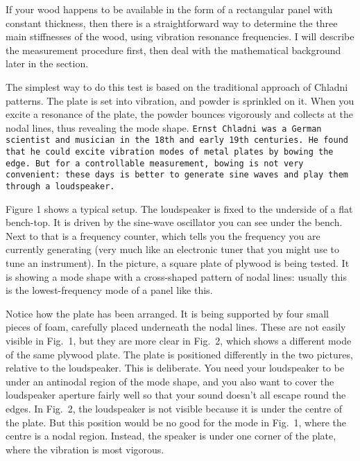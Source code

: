   If your wood happens to be available in the form of a rectangular panel with 
  constant thickness, then there is a straightforward way to determine the 
  three main stiffnesses of the wood, using vibration resonance frequencies. I 
  will describe the measurement procedure first, then deal with the 
  mathematical background later in the section. 

  The simplest way to do this test is based on the traditional approach of 
  Chladni patterns. The plate is set into vibration, and powder is sprinkled on 
  it. When you excite a resonance of the plate, the powder bounces vigorously 
  and collects at the nodal lines, thus revealing the mode shape. \tt{}Ernst 
  Chladni \rm{}was a German scientist and musician in the 18th and early 19th 
  centuries. He found that he could excite vibration modes of metal plates by 
  bowing the edge. But for a controllable measurement, bowing is not very 
  convenient: these days is better to generate sine waves and play them through 
  a loudspeaker. 

  Figure 1 shows a typical setup. The loudspeaker is fixed to the underside of 
  a flat bench-top. It is driven by the sine-wave oscillator you can see under 
  the bench. Next to that is a frequency counter, which tells you the frequency 
  you are currently generating (very much like an electronic tuner that you 
  might use to tune an instrument). In the picture, a square plate of plywood 
  is being tested. It is showing a mode shape with a cross-shaped pattern of 
  nodal lines: usually this is the lowest-frequency mode of a panel like this. 

  Notice how the plate has been arranged. It is being supported by four small 
  pieces of foam, carefully placed underneath the nodal lines. These are not 
  easily visible in Fig.\ 1, but they are more clear in Fig.\ 2, which shows a 
  different mode of the same plywood plate. The plate is positioned differently 
  in the two pictures, relative to the loudspeaker. This is deliberate. You 
  need your loudspeaker to be under an antinodal region of the mode shape, and 
  you also want to cover the loudspeaker aperture fairly well so that your 
  sound doesn’t all escape round the edges. In Fig.\ 2, the loudspeaker is not 
  visible because it is under the centre of the plate. But this position would 
  be no good for the mode in Fig.\ 1, where the centre is a nodal region. 
  Instead, the speaker is under one corner of the plate, where the vibration is 
  most vigorous. 

